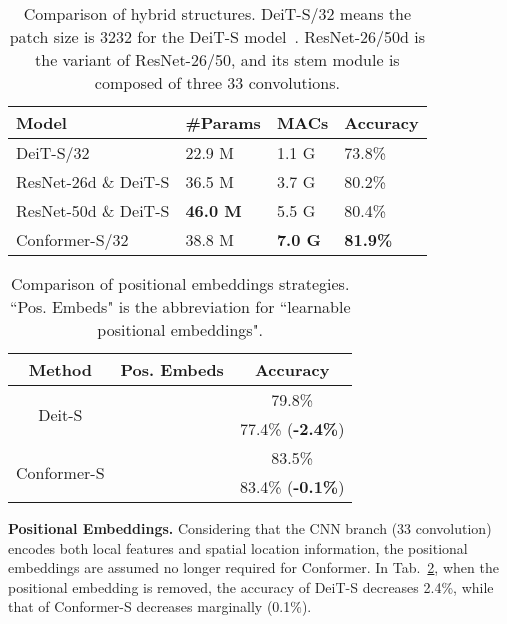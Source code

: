 \documentclass[10pt,twocolumn,letterpaper]{article}
\begin{document}
\begin{table}[t]
\begin{center}
\begin{tabular}{m{3cm}<{\centering} | m{2cm}<{\centering} m{1.1cm}<{\centering} | m{1.8cm}<{\centering}}
\toprule
Model  & \#Params & MACs & Accuracy \\
\midrule
\small DeiT-S/32 & 22.9 M & 1.1 G & 73.8\% \\
\small ResNet-26d \& DeiT-S  & 36.5 M & 3.7 G & 80.2\%  \\
\small ResNet-50d \& DeiT-S  & \textbf{46.0 M} & 5.5 G & 80.4\% \\
\small Conformer-S/32 & 38.8 M & \textbf{7.0 G} & \textbf{81.9\%} \\
\bottomrule
\end{tabular}
\end{center}
\vspace{-1em}
\caption{Comparison of hybrid structures. DeiT-S/32 means the patch size is 3232 for the DeiT-S model~\cite{DeiT2020}. ResNet-26/50d is the variant of ResNet-26/50, and its stem module is composed of three 33 convolutions.}
\label{tab:hybrid}
\end{table}
\begin{table}[t]
\begin{center}
\begin{tabular}{c|c|c}
\toprule
Method  & Pos. Embeds & Accuracy \\
\midrule
\multirow{2}{*}{Deit-S} & & 79.8\% \\
& & 77.4\% (\textbf{-2.4\%}) \\ \midrule
\multirow{2}{*}{Conformer-S} & & 83.5\% \\
&   & 83.4\% (\textbf{-0.1\%}) \\
\bottomrule
\end{tabular}
\end{center}
\vspace{-1em}
\caption{Comparison of positional embeddings strategies. ``Pos. Embeds" is the abbreviation for ``learnable positional embeddings".}
\label{tab:postition}
\end{table}


\noindent\textbf{Positional Embeddings.}
Considering that the CNN branch (33 convolution) encodes both local features and spatial location information, the positional embeddings are assumed no longer required for Conformer. In Tab.~\ref{tab:postition}, when the positional embedding is removed, the accuracy of DeiT-S decreases 2.4\%, while that of Conformer-S decreases marginally (0.1\%).
~\\
\end{document}
